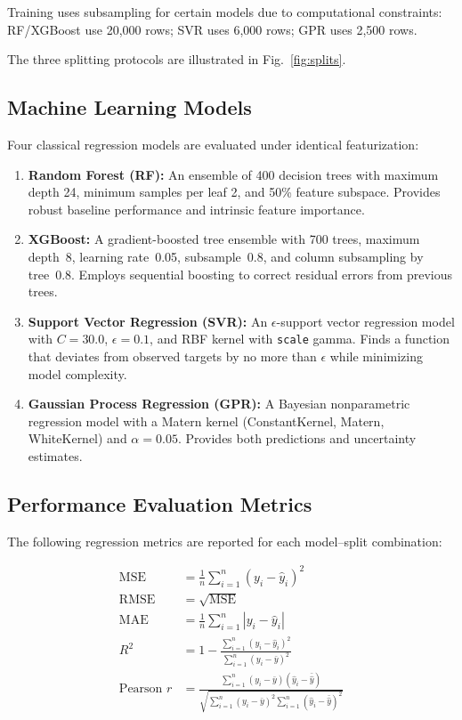 \documentclass[10pt,conference]{IEEEtran}
\begin{document}
Training uses subsampling for certain models due to computational constraints: RF/XGBoost use 20,000 rows; SVR uses 6,000 rows; GPR uses 2,500 rows.

The three splitting protocols are illustrated in Fig.~\ref{fig:splits}.

\subsection{Machine Learning Models}
\label{subsec:models}

Four classical regression models are evaluated under identical featurization:

\begin{enumerate}[leftmargin=*, itemsep=0pt]
    \item \textbf{Random Forest (RF):} An ensemble of 400 decision trees with maximum depth 24, minimum samples per leaf 2, and 50\% feature subspace. Provides robust baseline performance and intrinsic feature importance.
    \item \textbf{XGBoost:} A gradient-boosted tree ensemble with 700 trees, maximum depth~8, learning rate~0.05, subsample~0.8, and column subsampling by tree~0.8. Employs sequential boosting to correct residual errors from previous trees.
    \item \textbf{Support Vector Regression (SVR):} An $\epsilon$-support vector regression model with $C = 30.0$, $\epsilon = 0.1$, and RBF kernel with \texttt{scale} gamma. Finds a function that deviates from observed targets by no more than $\epsilon$ while minimizing model complexity.
    \item \textbf{Gaussian Process Regression (GPR):} A Bayesian nonparametric regression model with a Matern kernel (ConstantKernel, Matern, WhiteKernel) and $\alpha = 0.05$. Provides both predictions and uncertainty estimates.
\end{enumerate}

\subsection{Performance Evaluation Metrics}
\label{subsec:metrics}

The following regression metrics are reported for each model--split combination:

\begin{align}
\text{MSE} &= \frac{1}{n}\sum_{i=1}^{n}(y_i - \hat{y}_i)^2 \label{eq:mse} \\
\text{RMSE} &= \sqrt{\text{MSE}} \label{eq:rmse} \\
\text{MAE} &= \frac{1}{n}\sum_{i=1}^{n}|y_i - \hat{y}_i| \label{eq:mae} \\
R^2 &= 1 - \frac{\sum_{i=1}^{n}(y_i - \hat{y}_i)^2}{\sum_{i=1}^{n}(y_i - \bar{y})^2} \label{eq:r2} \\
\text{Pearson } r &= \frac{\sum_{i=1}^{n}(y_i - \bar{y})(\hat{y}_i - \bar{\hat{y}})}{\sqrt{\sum_{i=1}^{n}(y_i - \bar{y})^2 \sum_{i=1}^{n}(\hat{y}_i - \bar{\hat{y}})^2}} \label{eq:pearson}
\end{align}
\end{document}
